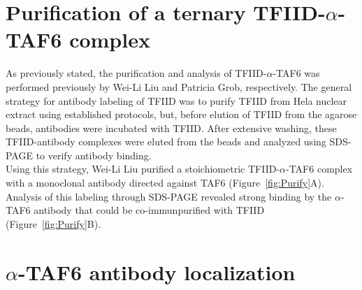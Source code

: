 \section{Purification of a ternary TFIID-$\alpha$-TAF6 complex}

As previously stated, the purification and analysis of TFIID-$\alpha$-TAF6 was performed previously by Wei-Li Liu and Patricia Grob, respectively. The general strategy for antibody labeling of TFIID was to purify TFIID from Hela nuclear extract using established protocols, but, before elution of TFIID from the agarose beads, antibodies were incubated with TFIID. After extensive washing, these TFIID-antibody complexes were eluted from the beads and analyzed using SDS-PAGE to verify antibody binding. \\
\indent Using this strategy, Wei-Li Liu purified a stoichiometric TFIID-$\alpha$-TAF6 complex with a monoclonal antibody directed against TAF6 (Figure~\ref{fig:Purify}A). Analysis of this labeling through SDS-PAGE revealed strong binding by the $\alpha$-TAF6 antibody that could be co-immunpurified with TFIID (Figure~\ref{fig:Purify}B). 

\section{$\alpha$-TAF6 antibody localization}

